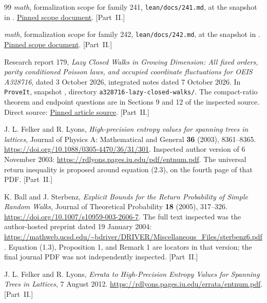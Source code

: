 \documentclass[11pt,letterpaper]{article}
\theoremstyle{remark}\newtheorem{remark}[theorem]{Remark}
\newcommand{\repo}{\texttt{ProveIt}}
\begin{document}
\begin{thebibliography}{99}
\emph{math}, formalization scope for family 241,
\texttt{lean/docs/241.md}, at the snapshot in \cite{mathrepo}.
\href{https://github.com/VladimirReshetnikov/math/blob/adc7f1241b42e322a6451854ab7e4b4c146bf78a/lean/docs/241.md}{Pinned scope document}.
[Part~II.]

\emph{math}, formalization scope for family 242,
\texttt{lean/docs/242.md}, at the snapshot in \cite{mathrepo}.
\href{https://github.com/VladimirReshetnikov/math/blob/adc7f1241b42e322a6451854ab7e4b4c146bf78a/lean/docs/242.md}{Pinned scope document}.
[Part~II.]

Research report 179, \emph{Lazy Closed Walks in Growing Dimension:
All fixed orders, parity conditioned Poisson laws, and occupied coordinate
fluctuations for OEIS A328716}, dated 3 October 2026, integrated notes
dated 7 October 2026. In \repo, snapshot \cite{proveit}, directory
\nolinkurl{a328716-lazy-closed-walks/}.
The compact-ratio theorem and endpoint questions are in Sections 9 and 12
of the inspected source. Direct source:
\href{https://github.com/VladimirReshetnikov/ProveIt/blob/136e707021c9df3a1b6af904ddad045ae38b7c23/SetTheory/Cardinals/docs/reports/generating-functions-and-asymptotics/oeis-sequence-asymptotics/a328716-lazy-closed-walks/article.tex}{Pinned article source}.
[Part~II.]

J. L. Felker and R. Lyons,
\emph{High-precision entropy values for spanning trees in lattices},
Journal of Physics A: Mathematical and General \textbf{36} (2003),
8361--8365. \url{https://doi.org/10.1088/0305-4470/36/31/301}.
Inspected author version of 6 November 2003:
\url{https://rdlyons.pages.iu.edu/pdf/entnum.pdf}.
The universal return inequality is proposed around equation (2.3),
on the fourth page of that PDF.
[Part~II.]

K. Ball and J. Sterbenz,
\emph{Explicit Bounds for the Return Probability of Simple Random Walks},
Journal of Theoretical Probability \textbf{18} (2005), 317--326.
\url{https://doi.org/10.1007/s10959-003-2606-7}.
The full text inspected was the author-hosted preprint dated
19 January 2004:
\url{https://mathweb.ucsd.edu/~bdriver/DRIVER/Miscellaneous_Files/sterbenz6.pdf}.
Equation (1.3), Proposition 1, and Remark 1 are locators in that version;
the final journal PDF was not independently inspected.
[Part~II.]

J. L. Felker and R. Lyons,
\emph{Errata to High-Precision Entropy Values for Spanning Trees in Lattices},
7 August 2012.
\url{https://rdlyons.pages.iu.edu/errata/entnum.pdf}.
[Part~II.]


\end{thebibliography}
\end{document}

